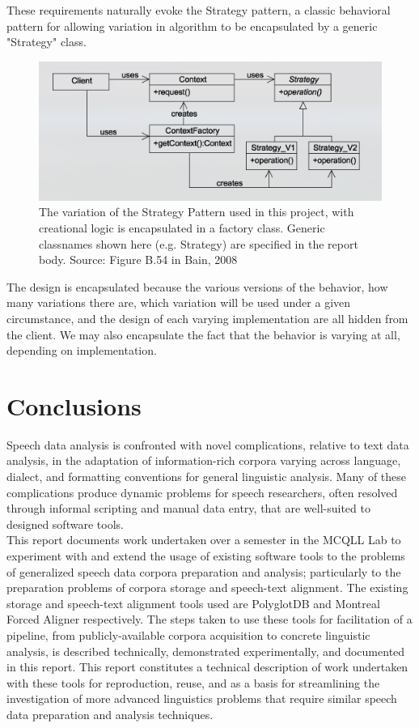 \documentclass[11pt]{article}
\begin{document}
These requirements naturally evoke the Strategy pattern\cite{freeman_head_2004}, a classic behavioral pattern for allowing variation in algorithm to be encapsulated by a generic "Strategy" class.

\begin{figure}[h]
\centering
\includegraphics[scale=0.5]{strategy-pattern.png}
\caption{The variation of the Strategy Pattern used in this project, with creational logic is encapsulated in a factory class. Generic classnames shown here (e.g. Strategy) are specified in the report body. Source: Figure B.54 in Bain, 2008\cite{bain_emergent_2008}}
\label{fig:strategy-pattern}
\end{figure}

The design is encapsulated because the various versions of the behavior, how many variations there are, which variation will be used under a given circumstance, and the design of each varying implementation are all hidden from the client. We may also encapsulate the fact that the behavior is varying at all, depending on implementation.

\section{Conclusions}

Speech data analysis is confronted with novel complications, relative to text data analysis, in the adaptation of information-rich corpora varying across language, dialect, and formatting conventions for general linguistic analysis. Many of these complications produce dynamic problems for speech researchers, often resolved through informal scripting and manual data entry, that are well-suited to designed software tools. \\

This report documents work undertaken over a semester in the MCQLL Lab to experiment with and extend the usage of existing software tools to the problems of generalized speech data corpora preparation and analysis; particularly to the preparation problems of corpora storage and speech-text alignment. The existing storage and speech-text alignment tools used are PolyglotDB and Montreal Forced Aligner respectively. The steps taken to use these tools for facilitation of a pipeline, from publicly-available corpora acquisition to concrete linguistic analysis, is described technically, demonstrated experimentally, and documented in this report. This report constitutes a technical description of work undertaken with these tools for reproduction, reuse, and as a basis for streamlining the investigation of more advanced linguistics problems that require similar speech data preparation and analysis techniques. \\
\end{document}
